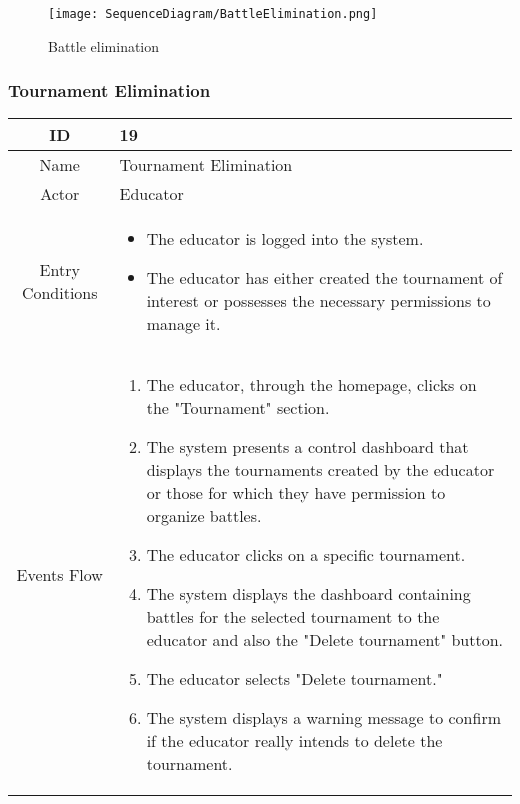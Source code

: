 \begin{longtable}{|c| p{10cm}|}
            
    \end{longtable}


        \begin{figure}[H]
  \texttt{[image: SequenceDiagram/BattleElimination.png]} 
  \caption{Battle elimination}
  \label{fig:immagine}
\end{figure}




\newpage
\subsubsection{Tournament Elimination}
\begin{longtable}{|c| p{10cm}|}
        \hline
            ID & 19 \\
        \hline
            Name & Tournament Elimination \\
        \hline
            Actor & Educator\\
        \hline
            Entry Conditions &
            \begin{itemize}
                \item The educator is logged into the system.
                \item The educator has either created the tournament of interest or possesses the necessary permissions to manage it.
            \end{itemize}\\
        \hline
            Events Flow &   \begin{enumerate}
                            \item The educator, through the homepage, clicks on the "Tournament" section.
                            \item The system presents a control dashboard that displays the tournaments created by the educator or those for which they have permission to organize battles.
                            \item The educator clicks on a specific tournament.
                            \item The system displays the dashboard containing battles for the selected tournament to the educator and also the "Delete tournament" button.
                            \item The educator selects "Delete tournament."
                            \item The system displays a warning message to confirm if the educator really intends to delete the tournament.

\end{enumerate}
\end{longtable}
